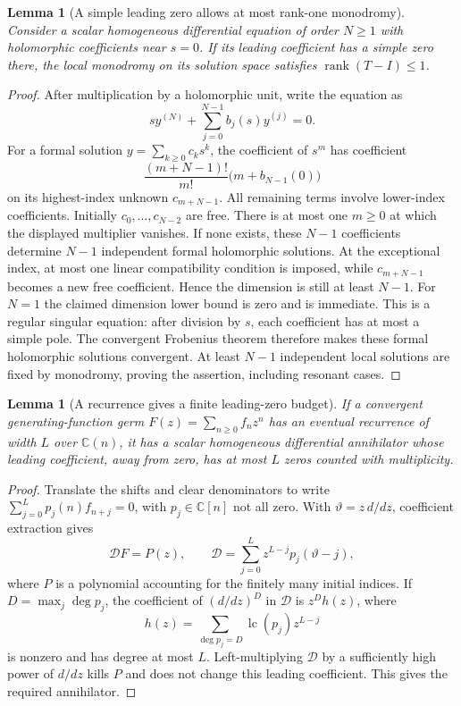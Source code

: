 \documentclass[11pt,a4paper]{article}
\newtheorem{lemma}[theorem]{Lemma}
\theoremstyle{definition}
\theoremstyle{remark}
\numberwithin{equation}{section}
\begin{document}
\begin{lemma}[A simple leading zero allows at most rank-one monodromy]
\label{p6:lem:simple-leading-zero}
Consider a scalar homogeneous differential equation of order $N\geq1$
with holomorphic coefficients near $s=0$. If its leading coefficient
has a simple zero there, the local monodromy on its solution space
satisfies $\operatorname{rank}(T-I)\leq1$.
\end{lemma}
\begin{proof}
After multiplication by a holomorphic unit, write the equation as
\[
 s y^{(N)}+\sum_{j=0}^{N-1}b_j(s)y^{(j)}=0.
\]
For a formal solution $y=\sum_{k\geq0}c_ks^k$, the coefficient of $s^m$
has coefficient
\[
 \frac{(m+N-1)!}{m!}\bigl(m+b_{N-1}(0)\bigr)
\]
on its highest-index unknown $c_{m+N-1}$. All remaining terms involve
lower-index coefficients. Initially $c_0,\ldots,c_{N-2}$ are free.
There is at most one $m\geq0$ at which the displayed multiplier vanishes.
If none exists, these $N-1$ coefficients determine $N-1$ independent
formal holomorphic solutions. At the exceptional index, at most one
linear compatibility condition is imposed, while $c_{m+N-1}$ becomes
a new free coefficient. Hence the dimension is still at least $N-1$.
For $N=1$ the claimed dimension lower bound is zero and is immediate.
This is a regular singular equation: after division by $s$, each
coefficient has at most a simple pole. The convergent Frobenius theorem
therefore makes these formal holomorphic solutions convergent.
At least $N-1$ independent local solutions are fixed by monodromy,
proving the assertion, including resonant cases.
\end{proof}

\begin{lemma}[A recurrence gives a finite leading-zero budget]
\label{p6:lem:cubic-budget}
If a convergent generating-function germ $F(z)=\sum_{n\geq0}f_nz^n$
has an eventual recurrence of width $L$ over $\mathbb C(n)$, it has
a scalar homogeneous differential annihilator whose leading
coefficient, away from zero, has at most $L$ zeros counted with
multiplicity.
\end{lemma}
\begin{proof}
Translate the shifts and clear denominators to write
$\sum_{j=0}^Lp_j(n)f_{n+j}=0$, with $p_j\in\mathbb C[n]$ not all zero.
With $\vartheta=z\,d/dz$, coefficient extraction gives
\[
 \mathcal DF=P(z),\qquad
 \mathcal D=\sum_{j=0}^L z^{L-j}p_j(\vartheta-j),
\]
where $P$ is a polynomial accounting for the finitely many initial
indices. If $D=\max_j\deg p_j$, the coefficient of $(d/dz)^D$ in
$\mathcal D$ is $z^D h(z)$, where
\[
 h(z)=\sum_{\deg p_j=D}\operatorname{lc}(p_j)z^{L-j}
\]
is nonzero and has degree at most $L$. Left-multiplying $\mathcal D$
by a sufficiently high power of $d/dz$ kills $P$ and does not change
this leading coefficient. This gives the required annihilator.
\end{proof}
\end{document}
